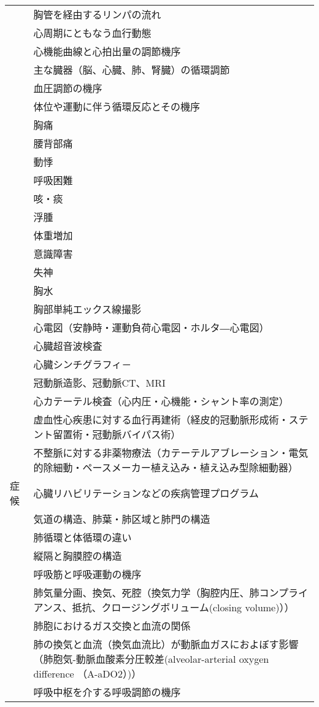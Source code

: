 \begin{xltabular}{\linewidth}{XX}
 & 胸管を経由するリンパの流れ \\
 & 心周期にともなう血行動態 \\
 & 心機能曲線と心拍出量の調節機序 \\
 & 主な臓器（脳、心臓、肺、腎臓）の循環調節 \\
 & 血圧調節の機序 \\
 & 体位や運動に伴う循環反応とその機序 \\
 & 胸痛 \\
 & 腰背部痛 \\
 & 動悸 \\
 & 呼吸困難 \\
 & 咳・痰 \\
 & 浮腫 \\
 & 体重増加 \\
 & 意識障害 \\
 & 失神 \\
 & 胸水 \\
 & 胸部単純エックス線撮影 \\
 & 心電図（安静時・運動負荷心電図・ホルタ―心電図） \\
 & 心臓超音波検査 \\
 & 心臓シンチグラフィ－ \\
 & 冠動脈造影、冠動脈CT、MRI \\
 & 心カテーテル検査（心内圧・心機能・シャント率の測定） \\
 & 虚血性心疾患に対する血行再建術（経皮的冠動脈形成術・ステント留置術・冠動脈バイパス術） \\
 & 不整脈に対する非薬物療法（カテーテルアブレーション・電気的除細動・ペースメーカー植え込み・植え込み型除細動器） \\
症候 & 心臓リハビリテーションなどの疾病管理プログラム \\
 & 気道の構造、肺葉・肺区域と肺門の構造 \\
 & 肺循環と体循環の違い \\
 & 縦隔と胸膜腔の構造 \\
 & 呼吸筋と呼吸運動の機序 \\
 & 肺気量分画、換気、死腔（換気力学（胸腔内圧、肺コンプライアンス、抵抗、クロージングボリューム(closing volume)）） \\
 & 肺胞におけるガス交換と血流の関係 \\
 & 肺の換気と血流（換気血流比）が動脈血ガスにおよぼす影響（肺胞気-動脈血酸素分圧較差(alveolar-arterial oxygen difference （A-aDO2）)） \\
 & 呼吸中枢を介する呼吸調節の機序 \\

\end{xltabular}
